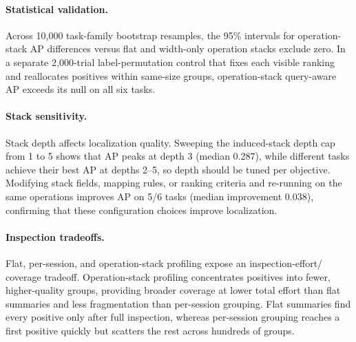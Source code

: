 \documentclass[letterpaper]{article}
\begin{document}
\paragraph{Statistical validation.}
Across 10{,}000 task-family bootstrap resamples, the 95\% intervals for
operation-stack AP differences versus flat and width-only operation stacks
exclude zero. In a separate 2{,}000-trial label-permutation control that fixes
each visible ranking and reallocates positives within same-size groups,
operation-stack query-aware AP exceeds its null on all six tasks.

\paragraph{Stack sensitivity.}
Stack depth affects localization quality.
Sweeping the induced-stack depth cap from 1 to 5 shows that AP peaks at depth 3
(median 0.287), while different tasks achieve their best AP at depths 2--5, so
depth should be tuned per objective.
Modifying stack fields, mapping rules, or ranking criteria and re-running on
the same operations improves AP on 5/6 tasks (median improvement 0.038),
confirming that these configuration choices improve localization.

\paragraph{Inspection tradeoffs.}
Flat, per-session, and operation-stack profiling expose an inspection-effort/
coverage tradeoff. Operation-stack profiling concentrates
positives into fewer, higher-quality groups, providing broader coverage at
lower total effort than flat summaries and less fragmentation than per-session
grouping. Flat summaries find every positive only after full inspection,
whereas per-session grouping reaches a first positive quickly but scatters the
rest across hundreds of groups.
\end{document}
